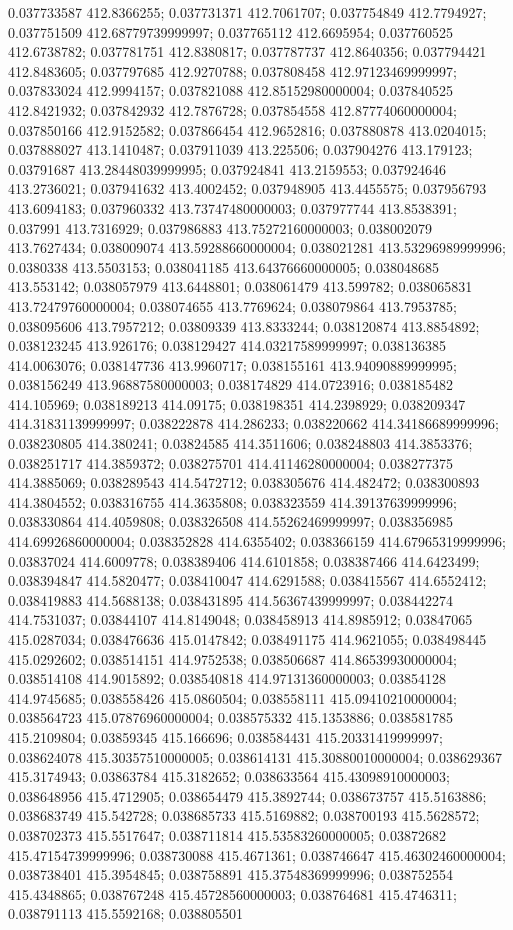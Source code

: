 0.037733587 412.8366255; 0.037731371 412.7061707; 0.037754849 412.7794927; 0.037751509 412.68779739999997; 0.037765112 412.6695954; 0.037760525 412.6738782; 0.037781751 412.8380817; 0.037787737 412.8640356; 0.037794421 412.8483605; 0.037797685 412.9270788; 0.037808458 412.97123469999997; 0.037833024 412.9994157; 0.037821088 412.85152980000004; 0.037840525 412.8421932; 0.037842932 412.7876728; 0.037854558 412.87774060000004; 0.037850166 412.9152582; 0.037866454 412.9652816; 0.037880878 413.0204015; 0.037888027 413.1410487; 0.037911039 413.225506; 0.037904276 413.179123; 0.03791687 413.28448039999995; 0.037924841 413.2159553; 0.037924646 413.2736021; 0.037941632 413.4002452; 0.037948905 413.4455575; 0.037956793 413.6094183; 0.037960332 413.73747480000003; 0.037977744 413.8538391; 0.037991 413.7316929; 0.037986883 413.75272160000003; 0.038002079 413.7627434; 0.038009074 413.59288660000004; 0.038021281 413.53296989999996; 0.0380338 413.5503153; 0.038041185 413.64376660000005; 0.038048685 413.553142; 0.038057979 413.6448801; 0.038061479 413.599782; 0.038065831 413.72479760000004; 0.038074655 413.7769624; 0.038079864 413.7953785; 0.038095606 413.7957212; 0.03809339 413.8333244; 0.038120874 413.8854892; 0.038123245 413.926176; 0.038129427 414.03217589999997; 0.038136385 414.0063076; 0.038147736 413.9960717; 0.038155161 413.94090889999995; 0.038156249 413.96887580000003; 0.038174829 414.0723916; 0.038185482 414.105969; 0.038189213 414.09175; 0.038198351 414.2398929; 0.038209347 414.31831139999997; 0.038222878 414.286233; 0.038220662 414.34186689999996; 0.038230805 414.380241; 0.03824585 414.3511606; 0.038248803 414.3853376; 0.038251717 414.3859372; 0.038275701 414.41146280000004; 0.038277375 414.3885069; 0.038289543 414.5472712; 0.038305676 414.482472; 0.038300893 414.3804552; 0.038316755 414.3635808; 0.038323559 414.39137639999996; 0.038330864 414.4059808; 0.038326508 414.55262469999997; 0.038356985 414.69926860000004; 0.038352828 414.6355402; 0.038366159 414.67965319999996; 0.03837024 414.6009778; 0.038389406 414.6101858; 0.038387466 414.6423499; 0.038394847 414.5820477; 0.038410047 414.6291588; 0.038415567 414.6552412; 0.038419883 414.5688138; 0.038431895 414.56367439999997; 0.038442274 414.7531037; 0.03844107 414.8149048; 0.038458913 414.8985912; 0.03847065 415.0287034; 0.038476636 415.0147842; 0.038491175 414.9621055; 0.038498445 415.0292602; 0.038514151 414.9752538; 0.038506687 414.86539930000004; 0.038514108 414.9015892; 0.038540818 414.97131360000003; 0.03854128 414.9745685; 0.038558426 415.0860504; 0.038558111 415.09410210000004; 0.038564723 415.07876960000004; 0.038575332 415.1353886; 0.038581785 415.2109804; 0.03859345 415.166696; 0.038584431 415.20331419999997; 0.038624078 415.30357510000005; 0.038614131 415.30880010000004; 0.038629367 415.3174943; 0.03863784 415.3182652; 0.038633564 415.43098910000003; 0.038648956 415.4712905; 0.038654479 415.3892744; 0.038673757 415.5163886; 0.038683749 415.542728; 0.038685733 415.5169882; 0.038700193 415.5628572; 0.038702373 415.5517647; 0.038711814 415.53583260000005; 0.03872682 415.47154739999996; 0.038730088 415.4671361; 0.038746647 415.46302460000004; 0.038738401 415.3954845; 0.038758891 415.37548369999996; 0.038752554 415.4348865; 0.038767248 415.45728560000003; 0.038764681 415.4746311; 0.038791113 415.5592168; 0.038805501 